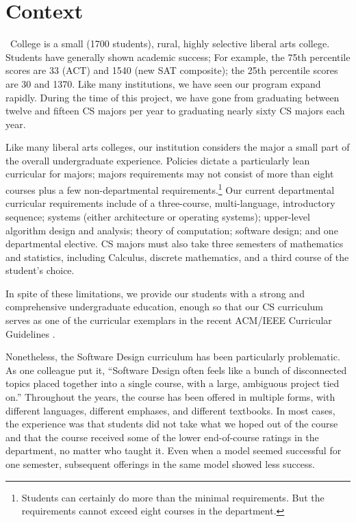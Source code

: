 \section{Context}

\college\ College is a small (1700 students), rural, highly selective
liberal arts college.  Students have generally shown academic
success; For example, the 75th percentile scores are 33 (ACT) and
1540 (new SAT composite); the 25th percentile scores are 30 and
1370.  Like many institutions, we have seen our program expand
rapidly.  During the time of this project, we have gone from
graduating between twelve and fifteen CS majors per year to graduating
nearly sixty CS majors each year.

Like many liberal arts colleges, our institution considers the major a
small part of the overall undergraduate experience.  Policies dictate
a particularly lean curricular for majors; majors requirements may
not consist of more than eight courses plus a few non-departmental
requirements.\footnote{Students can certainly do more than the
minimal requirements.  But the requirements cannot exceed eight
courses in the department.} Our current departmental curricular
requirements include of a three-course, multi-language, introductory
sequence; systems (either architecture or operating systems);
upper-level algorithm design and analysis; theory of computation;
software design; and one departmental elective.  CS majors must
also take three semesters of mathematics and statistics, including
Calculus, discrete mathematics, and a third course of the student's
choice.  

In spite of these limitations, we provide our students with a strong
and comprehensive undergraduate education, enough so that our
CS curriculum serves as one of the curricular exemplars in the
recent ACM/IEEE Curricular Guidelines \cite{curriculum-2013}.

Nonetheless, the Software Design curriculum has been particularly
problematic.  As one colleague put it, ``Software Design often feels
like a bunch of disconnected topics placed together into a single
course, with a large, ambiguous project tied on.''  Throughout the
years, the course has been offered in multiple forms, with different
languages, different emphases, and different textbooks.  In most
cases, the experience was that students did not take what we hoped
out of the course and that the course received some of the lower
end-of-course ratings in the department, no matter who taught it.
Even when a model seemed successful for one semester, subsequent
offerings in the same model showed less success.


